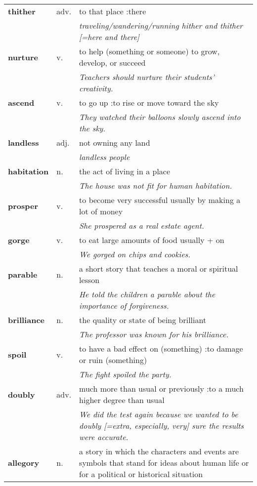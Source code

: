 \documentclass[a4paper]{article}
\begin{document}
\begin{longtable}{llp{11cm}}
\textbf{thither} & adv. &  to that place :there \\
 & & \textit{traveling/wandering/running hither and thither [=here and there]}\\[0.08cm]
\textbf{nurture} & v. &  to help (something or someone) to grow, develop, or succeed \\
 & & \textit{Teachers should nurture their students' creativity.}\\[0.08cm]
\textbf{ascend} & v. &  to go up :to rise or move toward the sky \\
 & & \textit{They watched their balloons slowly ascend into the sky.}\\[0.08cm]
\textbf{landless} & adj. &  not owning any land \\
 & & \textit{landless people}\\[0.08cm]
\textbf{habitation} & n. &  the act of living in a place \\
 & & \textit{The house was not fit for human habitation.}\\[0.08cm]
\textbf{prosper} & v. &  to become very successful usually by making a lot of money \\
 & & \textit{She prospered as a real estate agent.}\\[0.08cm]
\textbf{gorge} & v. &  to eat large amounts of food usually + on \\
 & & \textit{We gorged on chips and cookies.}\\[0.08cm]
\textbf{parable} & n. &  a short story that teaches a moral or spiritual lesson \\
 & & \textit{He told the children a parable about the importance of forgiveness.}\\[0.08cm]
\textbf{brilliance} & n. &  the quality or state of being brilliant \\
 & & \textit{The professor was known for his brilliance.}\\[0.08cm]
\textbf{spoil} & v. &  to have a bad effect on (something) :to damage or ruin (something) \\
 & & \textit{The fight spoiled the party.}\\[0.08cm]
\textbf{doubly} & adv. &  much more than usual or previously :to a much higher degree than usual \\
 & & \textit{We did the test again because we wanted to be doubly [=extra, especially, very] sure the results were accurate.}\\[0.08cm]
\textbf{allegory} & n. &  a story in which the characters and events are symbols that stand for ideas about human life or for a political or historical situation \\

\end{longtable}
\end{document}
